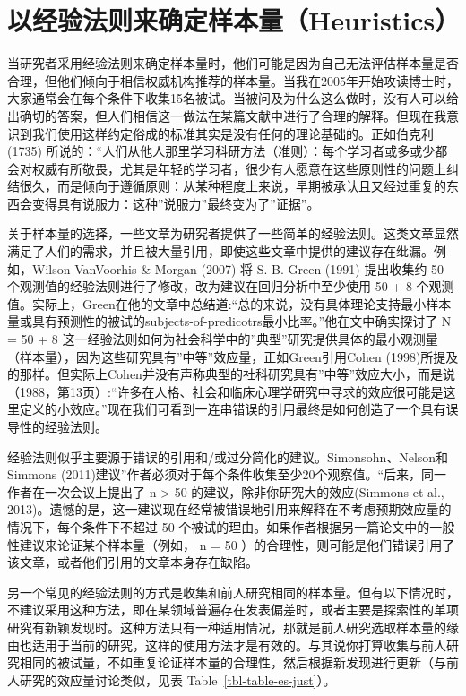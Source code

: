 \documentclass[
  letterpaper,
  DIV=11,
  numbers=noendperiod]{scrreprt}
\begin{document}
\hypertarget{ux4ee5ux7ecfux9a8cux6cd5ux5219ux6765ux786eux5b9aux6837ux672cux91cfheuristics}{%
\section{以经验法则来确定样本量（Heuristics）}\label{ux4ee5ux7ecfux9a8cux6cd5ux5219ux6765ux786eux5b9aux6837ux672cux91cfheuristics}}

当研究者采用经验法则来确定样本量时，他们可能是因为自己无法评估样本量是否合理，但他们倾向于相信权威机构推荐的样本量。当我在2005年开始攻读博士时，大家通常会在每个条件下收集15名被试。当被问及为什么这么做时，没有人可以给出确切的答案，但人们相信这一做法在某篇文献中进行了合理的解释。但现在我意识到我们使用这样约定俗成的标准其实是没有任何的理论基础的。正如伯克利
(1735)
所说的：``人们从他人那里学习科研方法（准则）：每个学习者或多或少都会对权威有所敬畏，尤其是年轻的学习者，很少有人愿意在这些原则性的问题上纠结很久，而是倾向于遵循原则：从某种程度上来说，早期被承认且又经过重复的东西会变得具有说服力：这种''说服力''最终变为了''证据''。

关于样本量的选择，一些文章为研究者提供了一些简单的经验法则。这类文章显然满足了人们的需求，并且被大量引用，即使这些文章中提供的建议存在纰漏。例如，Wilson
VanVoorhis \& Morgan (2007) 将 S. B. Green (1991) 提出收集约 50
个观测值的经验法则进行了修改，改为建议在回归分析中至少使用 50 + 8
个观测值。实际上，Green在他的文章中总结道:``总的来说，没有具体理论支持最小样本量或具有预测性的被试的subjects-of-predicotrs最小比率。''他在文中确实探讨了
N = 50 + 8
这一经验法则如何为社会科学中的''典型''研究提供具体的最小观测量（样本量），因为这些研究具有''中等''效应量，正如Green引用Cohen
(1998)所提及的那样。但实际上Cohen并没有声称典型的社科研究具有''中等''效应大小，而是说（1988，第13页）:``许多在人格、社会和临床心理学研究中寻求的效应很可能是这里定义的小效应。''现在我们可看到一连串错误的引用最终是如何创造了一个具有误导性的经验法则。

经验法则似乎主要源于错误的引用和/或过分简化的建议。Simonsohn、Nelson和Simmons
(2011)建议''作者必须对于每个条件收集至少20个观察值。``后来，同一作者在一次会议上提出了
n \textgreater{} 50 的建议，除非你研究大的效应(Simmons et al.,
2013)。遗憾的是，这一建议现在经常被错误地引用来解释在不考虑预期效应量的情况下，每个条件下不超过
50
个被试的理由。如果作者根据另一篇论文中的一般性建议来论证某个样本量（例如，
n = 50
）的合理性，则可能是他们错误引用了该文章，或者他们引用的文章本身存在缺陷。

另一个常见的经验法则的方式是收集和前人研究相同的样本量。但有以下情况时，不建议采用这种方法，即在某领域普遍存在发表偏差时，或者主要是探索性的单项研究有新颖发现时。这种方法只有一种适用情况，那就是前人研究选取样本量的缘由也适用于当前的研究，这样的使用方法才是有效的。与其说你打算收集与前人研究相同的被试量，不如重复论证样本量的合理性，然后根据新发现进行更新（与前人研究的效应量讨论类似，见表
Table~\ref{tbl-table-es-just}）。
\end{document}
